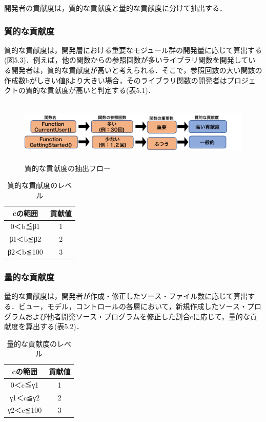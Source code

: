 \documentclass{funthesis}
\begin{document}
開発者の貢献度は，質的な貢献度と量的な貢献度に分けて抽出する．
\subsubsection{質的な貢献度}
質的な貢献度は，開発層における重要なモジュール群の開発量に応じて算出する(図5.3)．例えば，他の関数からの参照回数が多いライブラリ関数を開発している開発者は，質的な貢献度が高いと考えられる．そこで，参照回数の大い関数の作成数bがしきい値βより大きい場合，そのライブラリ関数の開発者はプロジェクトの質的な貢献度が高いと判定する(表5.1)．
\begin{figure}[!t]
\centering  %
\includegraphics[clip,width=16cm,height=3cm]{figures/contribution_quality.pdf}
  \caption{質的な貢献度の抽出フロー}    \label{sample}
\end{figure}

\begin{table}[htb]
  \begin{center}
    \begin{tabular}{|c||c|} \hline
      cの範囲 & 貢献値  \\ \hline
      0＜b≦β1 & 1 \\ \hline 
      β1＜b≦β2 & 2 \\ \hline 
      β2＜b≦100 & 3  \\ \hline
    \end{tabular}
  \end{center}
  \caption{質的な貢献度のレベル}    \label{sample}
\end{table}

\subsubsection{量的な貢献度}
量的な貢献度は，開発者が作成・修正したソース・ファイル数に応じて算出する．ビュー，モデル，コントロールの各層において，新規作成したソース・プログラムおよび他者開発ソース・プログラムを修正した割合cに応じて，量的な貢献度を算出する(表5.2)．
\begin{table}[htb]
  \begin{center}
    \begin{tabular}{|c||c|} \hline
      cの範囲 & 貢献値  \\ \hline
      0＜c≦γ1 & 1 \\ \hline 
      γ1＜c≦γ2 & 2 \\ \hline 
      γ2＜c≦100 & 3  \\ \hline
    \end{tabular}
  \end{center}
  \caption{量的な貢献度のレベル}    \label{sample}
\end{table}
\end{document}

